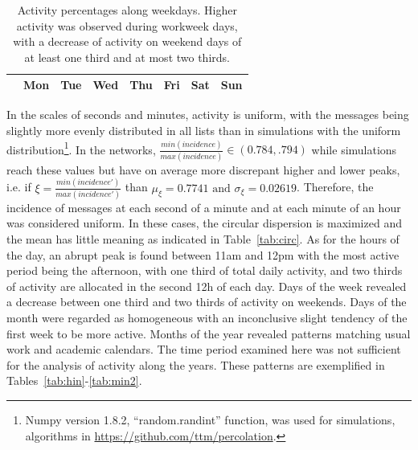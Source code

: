 \begin{table}
\caption{Activity percentages along the hours of the day. Nearly identical distributions were observed on other social systems as shown in Section~\ref*{si:hours} of the Supporting Information document.
Highest activity was observed between noon and 6pm (with 1/3 of total day activity), followed by the time period between 6pm and midnight.
Around 2/3 of the activity takes place from noon to midnight
but the activity peak occurs between 11 a.m. and 12 p.m.
This table shows results for the activity in CPP.}
\footnotesize

\label{tab:hin}
\end{table}


\begin{table}
\caption{Activity percentages along weekdays.
Higher activity was observed during workweek days, with a decrease of activity on weekend days of at least one third and at most two thirds.}
\begin{center}
\begin{tabular}{ | l ||  c | c | c | c | c |   c | c |}
\hline
& Mon & Tue & Wed & Thu & Fri & Sat & Sun  \\ \hline

\end{tabular}
\end{center}
\label{tab:win}
\end{table}

In the scales of seconds and minutes, activity is uniform,
with the messages being slightly more evenly distributed in all lists than in simulations with the uniform distribution\footnote{Numpy version 1.8.2, ``random.randint'' function, was used for simulations, algorithms in \url{https://github.com/ttm/percolation}.}.
In the networks, $\frac{min(incidence)}{max(incidence)} \in (0.784,.794)$ while simulations reach these values but have on average more discrepant higher and lower peaks, i.e. if $\xi=\frac{min(incidence')}{max(incidence')}$ than $\mu_\xi=0.7741 \text{ and } \sigma_\xi=0.02619$.
Therefore, the incidence of messages at each second of a minute and at each minute of an hour was considered uniform.
In these cases, the circular dispersion is maximized and the mean has little meaning as indicated in Table~\ref{tab:circ}.
As for the hours of the day, an abrupt peak is found between 11am and 12pm with the most active period being the afternoon, with one third of total daily activity, and two thirds of activity are allocated in the second 12h of each day. Days of the week revealed a decrease between one third and two thirds of activity on weekends.
Days of the month were regarded as homogeneous with an inconclusive slight tendency of the first week to be more active.
Months of the year revealed patterns matching usual work and academic calendars. The time period examined here was not sufficient for the analysis of activity along the years. These patterns are exemplified in Tables~\ref{tab:hin}-\ref{tab:min2}.


